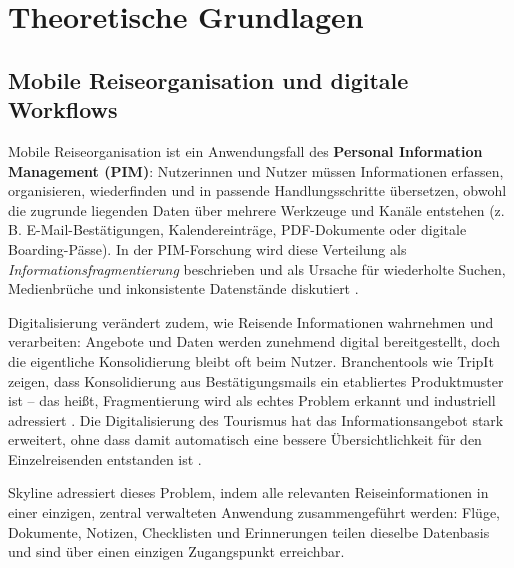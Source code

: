 \chapter{Theoretische Grundlagen}\label{chapter:theorie}

\section{Mobile Reiseorganisation und digitale Workflows}

Mobile Reiseorganisation ist ein Anwendungsfall des \textbf{Personal Information
Management (PIM)}: Nutzerinnen und Nutzer müssen Informationen erfassen,
organisieren, wiederfinden und in passende Handlungsschritte übersetzen, obwohl
die zugrunde liegenden Daten über mehrere Werkzeuge und Kanäle entstehen
(z.\,B. E-Mail-Bestätigungen, Kalendereinträge, PDF-Dokumente oder digitale
Boarding-Pässe). In der PIM-Forschung wird diese Verteilung als
\textit{Informationsfragmentierung} beschrieben und als Ursache für
wiederholte Suchen, Medienbrüche und inkonsistente Datenstände diskutiert
\cite{karger_jones2006_dataunification,bergman2006_project_fragmentation}.

Digitalisierung verändert zudem, wie Reisende Informationen wahrnehmen und
verarbeiten: Angebote und Daten werden zunehmend digital bereitgestellt, doch
die eigentliche Konsolidierung bleibt oft beim Nutzer. Branchentools wie
TripIt zeigen, dass Konsolidierung aus Bestätigungsmails ein etabliertes
Produktmuster ist -- das heißt, Fragmentierung wird als echtes Problem
erkannt und industriell adressiert \cite{tripit_official_forward_emails,
tripit_appstore_offline_and_upload}. Die Digitalisierung des Tourismus hat
das Informationsangebot stark erweitert, ohne dass damit automatisch eine
bessere Übersichtlichkeit für den Einzelreisenden entstanden ist
\cite{weberleibrecht2021_digitalisierung_tourismus}.

Skyline adressiert dieses Problem, indem alle relevanten Reiseinformationen
in einer einzigen, zentral verwalteten Anwendung zusammengeführt werden:
Flüge, Dokumente, Notizen, Checklisten und Erinnerungen teilen dieselbe
Datenbasis und sind über einen einzigen Zugangspunkt erreichbar.

